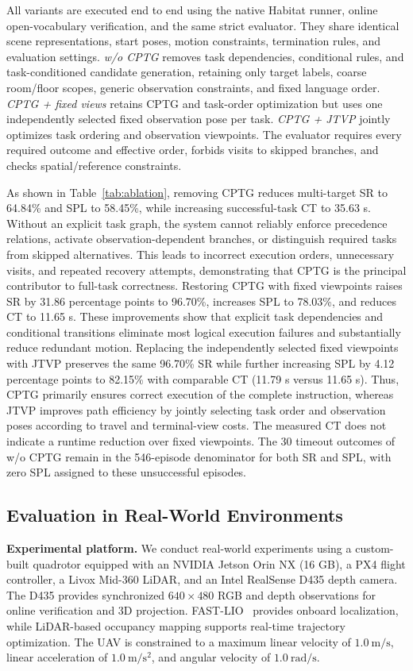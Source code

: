 \documentclass[letterpaper,10pt,journal]{IEEEtran}
\begin{document}
All variants are executed end to end using the native Habitat runner, online open-vocabulary verification, and the same strict evaluator. They share identical scene representations, start poses, motion constraints, termination rules, and evaluation settings. \emph{w/o CPTG} removes task dependencies, conditional rules, and task-conditioned candidate generation, retaining only target labels, coarse room/floor scopes, generic observation constraints, and fixed language order. \emph{CPTG + fixed views} retains CPTG and task-order optimization but uses one independently selected fixed observation pose per task. \emph{CPTG + JTVP} jointly optimizes task ordering and observation viewpoints. The evaluator requires every required outcome and effective order, forbids visits to skipped branches, and checks spatial/reference constraints.

As shown in Table~\ref{tab:ablation}, removing CPTG reduces multi-target SR to 64.84\% and SPL to 58.45\%, while increasing successful-task CT to 35.63 s. Without an explicit task graph, the system cannot reliably enforce precedence relations, activate observation-dependent branches, or distinguish required tasks from skipped alternatives. This leads to incorrect execution orders, unnecessary visits, and repeated recovery attempts, demonstrating that CPTG is the principal contributor to full-task correctness. Restoring CPTG with fixed viewpoints raises SR by 31.86 percentage points to 96.70\%, increases SPL to 78.03\%, and reduces CT to 11.65 s. These improvements show that explicit task dependencies and conditional transitions eliminate most logical execution failures and substantially reduce redundant motion. Replacing the independently selected fixed viewpoints with JTVP preserves the same 96.70\% SR while further increasing SPL by 4.12 percentage points to 82.15\% with comparable CT (11.79 s versus 11.65 s). Thus, CPTG primarily ensures correct execution of the complete instruction, whereas JTVP improves path efficiency by jointly selecting task order and observation poses according to travel and terminal-view costs. The measured CT does not indicate a runtime reduction over fixed viewpoints. The 30 timeout outcomes of w/o CPTG remain in the 546-episode denominator for both SR and SPL, with zero SPL assigned to these unsuccessful episodes.

\subsection{Evaluation in Real-World Environments}
\textbf{Experimental platform.}
We conduct real-world experiments using a custom-built quadrotor equipped with an NVIDIA Jetson Orin NX (16 GB), a PX4 flight controller, a Livox Mid-360 LiDAR, and an Intel RealSense D435 depth camera. The D435 provides synchronized $640\times480$ RGB and depth observations for online verification and 3D projection. FAST-LIO~\cite{xu2021fastlio} provides onboard localization, while LiDAR-based occupancy mapping supports real-time trajectory optimization. The UAV is constrained to a maximum linear velocity of $1.0~\mathrm{m/s}$, linear acceleration of $1.0~\mathrm{m/s^2}$, and angular velocity of $1.0~\mathrm{rad/s}$.
\end{document}
